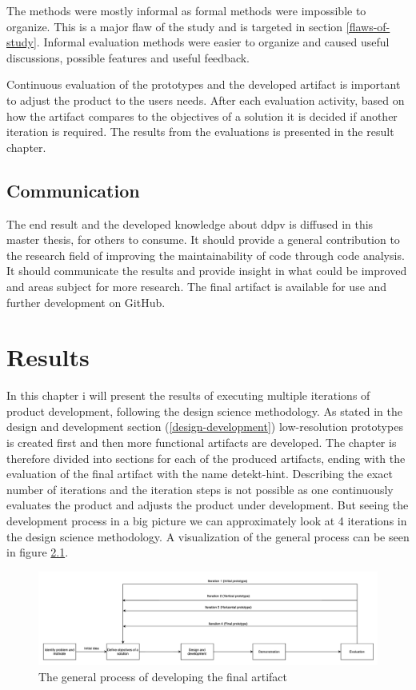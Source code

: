 \documentclass{report}
\begin{document}
The methods were mostly informal as formal methods were impossible to organize. This is a major flaw of the study and is targeted in section \ref{flaws-of-study}. Informal evaluation methods were easier to organize and caused useful discussions, possible features and useful feedback. 

Continuous evaluation of the prototypes and the developed artifact is important to adjust the product to the users needs. After each evaluation activity, based on how the artifact compares to the objectives of a solution it is decided if another iteration is required. The results from the evaluations is presented in the result chapter.

\section{Communication}
The end result and the developed knowledge about \gls{ddpv} is diffused in this master thesis, for others to consume. It should provide a general contribution to the research field of improving the maintainability of code through code analysis. It should communicate the results and provide insight in what could be improved and areas subject for more research. The final artifact is available for use and further development on GitHub\cite{detekt-hint-repository}.

\chapter{Results}
\label{results}
In this chapter i will present the results of executing multiple iterations of product development, following the design science methodology. As stated in the design and development section (\ref{design-development}) low-resolution 
prototypes is created first and then more functional artifacts are developed. The chapter is therefore divided into sections for each of the produced artifacts, ending with the evaluation of the final artifact with the name detekt-hint. Describing the exact number of iterations and the iteration steps is not possible as one continuously evaluates the product and adjusts the product under development. But seeing the development process in a big picture we can approximately look at 4 iterations in the design science methodology. A visualization of the general process can be seen in figure \ref{fig:workflow}.


\begin{figure}[h!]
    \centering
    \includegraphics[width=\linewidth]{../images/workflow.png}
    \caption{The general process of developing the final artifact}
    \label{fig:workflow}
\end{figure}
\end{document}
